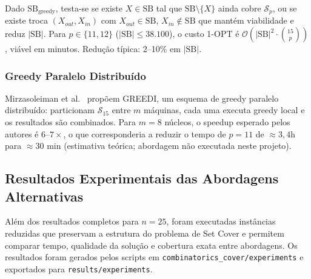 \documentclass[12pt,a4paper]{article}
\theoremstyle{definition}
\newcommand{\bigo}[1]{\mathcal{O}\!\left(#1\right)}
\newcommand{\C}[2]{\binom{#1}{#2}}
\newcommand{\SB}{\mathrm{SB}}
\begin{document}
Dado $\SB_\text{greedy}$, testa-se se existe $X \in \SB$ tal que $\SB \setminus
\{X\}$ ainda cobre $\mathcal{S}_p$, ou se existe troca $(X_{out}, X_{in})$ com
$X_{out} \in \SB$, $X_{in} \notin \SB$ que mantém viabilidade e reduz $|\SB|$.
Para $p \in \{11, 12\}$ ($|\SB| \leq 38.100$), o custo 1-OPT é
$\bigo{|\SB|^2 \cdot \C{15}{p}}$, viável em minutos. Redução típica: 2--10\%
em $|\SB|$.

\subsubsection{Greedy Paralelo Distribuído}

Mirzasoleiman et al.~\cite{mirzasoleiman2013} propõem GREEDI, um esquema de
greedy paralelo distribuído: particionam $\mathcal{S}_{15}$ entre $m$ máquinas,
cada uma executa greedy local e os resultados são combinados. Para $m=8$ núcleos, o speedup
esperado pelos autores é $6$--$7\times$, o que corresponderia a reduzir o tempo
de $p=11$ de $\approx 3{,}4$h para $\approx 30$ min (estimativa teórica;
abordagem não executada neste projeto).

\subsection{Resultados Experimentais das Abordagens Alternativas}

Além dos resultados completos para $n=25$, foram executadas instâncias
reduzidas que preservam a estrutura do problema de Set Cover e permitem comparar
tempo, qualidade da solução e cobertura exata entre abordagens. Os resultados
foram gerados pelos scripts em \texttt{combinatorics\_cover/experiments} e
exportados para \texttt{results/experiments}.
\end{document}
